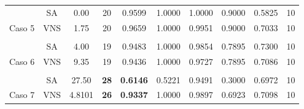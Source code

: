 \begin{table}
{\begin{tabular}{cccccccccc}
			\multicolumn{1}{c|}{}                         & SA  & 0.00                                                                 & 20                                                                 & 0.9599                                                  & 1.0000 & 1.0000 & 0.9000 & 0.5825 & 10           \\
			\multicolumn{1}{c|}{\multirow{-2}{*}{Caso 5}} & VNS & 1.75                                                               & 20                                                                 & 0.9659                                                  & 1.0000 & 0.9951 & 0.9000 & 0.7033 & 10           \\
			&     &                                                                      &                                                                    &                                                         &        &        &        &        &              \\
			\multicolumn{1}{c|}{}                         & SA  & 4.00                                                                 & 19                                                                 & 0.9483                                                  & 1.0000 & 0.9854 & 0.7895 & 0.7300 & 10           \\
			\multicolumn{1}{c|}{\multirow{-2}{*}{Caso 6}} & VNS & 9.35                                                               & 19                                                                 & 0.9436                                                  & 1.0000 & 0.9727 & 0.7895 & 0.7086 & 10           \\
			&     &                                                                      &                                                                    &                                                         &        &        &        &        &              \\
			\multicolumn{1}{c|}{}                         & SA  & 27.50                                                                & {\color[HTML]{9A0000} \textbf{28}}                                 & {\color[HTML]{9A0000} \textbf{0.6146}}                  & 0.5221 & 0.9491 & 0.3000 & 0.6972 & 10           \\
			\multicolumn{1}{c|}{\multirow{-2}{*}{Caso 7}} & VNS & 4.8101                                                               & {\color[HTML]{9A0000} \textbf{26}}                                 & {\color[HTML]{9A0000} \textbf{0.9337}}                  & 1.0000 & 0.9897 & 0.6923 & 0.7098 & 10           \\

\end{tabular}}
\end{table}
